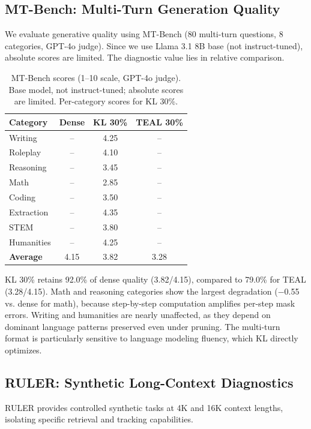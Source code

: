 \documentclass[11pt,a4paper]{article}
\begin{document}
\subsection{MT-Bench: Multi-Turn Generation Quality}
\label{sec:mtbench}

We evaluate generative quality using MT-Bench (80 multi-turn questions, 8 categories, GPT-4o judge).
Since we use Llama 3.1 8B base (not instruct-tuned), absolute scores are limited.
The diagnostic value lies in relative comparison.

\begin{table}[h]
\centering
\small
\caption{MT-Bench scores (1--10 scale, GPT-4o judge). Base model, not instruct-tuned; absolute scores are limited. Per-category scores for KL 30\%.}
\label{tab:mtbench}
\begin{tabular}{lccc}
\toprule
\textbf{Category} & \textbf{Dense} & \textbf{KL 30\%} & \textbf{TEAL 30\%} \\
\midrule
Writing & -- & 4.25 & -- \\
Roleplay & -- & 4.10 & -- \\
Reasoning & -- & 3.45 & -- \\
Math & -- & 2.85 & -- \\
Coding & -- & 3.50 & -- \\
Extraction & -- & 4.35 & -- \\
STEM & -- & 3.80 & -- \\
Humanities & -- & 4.25 & -- \\
\midrule
\textbf{Average} & 4.15 & 3.82 & 3.28 \\
\bottomrule
\end{tabular}
\end{table}

KL 30\% retains 92.0\% of dense quality (3.82/4.15), compared to 79.0\% for TEAL (3.28/4.15).
Math and reasoning categories show the largest degradation ($-$0.55 vs. dense for math), because step-by-step computation amplifies per-step mask errors.
Writing and humanities are nearly unaffected, as they depend on dominant language patterns preserved even under pruning.
The multi-turn format is particularly sensitive to language modeling fluency, which KL directly optimizes.

\subsection{RULER: Synthetic Long-Context Diagnostics}
\label{sec:ruler}

RULER provides controlled synthetic tasks at 4K and 16K context lengths, isolating specific retrieval and tracking capabilities.
\end{document}
